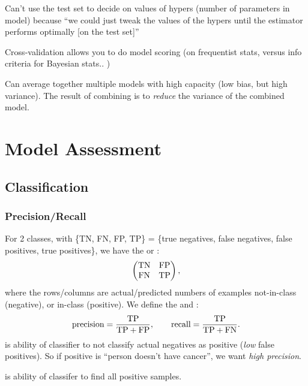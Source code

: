 \documentclass[11pt]{article}
\begin{document}
Can't use the test set to decide on values of hypers (\eeg number of parameters
in model) because ``we could just tweak the values of the hypers until the
estimator performs optimally [on the test set]''

Cross-validation allows you to do model scoring (on frequentist stats, versus
\eeg info criteria for Bayesian stats.. )

Can average together multiple models with high capacity (low bias, but high
variance). The result of combining is to \emph{reduce} the variance of the
combined model.



\section{Model Assessment}
\label{sec:model_ass}
\subsection{Classification}
\subsubsection{Precision/Recall}
For 2 classes, with \{TN, FN, FP, TP\} = \{true negatives, false negatives,
false positives, true positives\}, we have the  or :
\begin{equation}
  \left(
    \begin{matrix}
      \textrm{TN} & \textrm{FP}\\
      \textrm{FN} & \textrm{TP}
    \end{matrix}
  \right),
\end{equation}
where the rows/columns are actual/predicted numbers of examples not-in-class
(negative), or in-class (positive). We define the  and
:
\begin{equation}
  \textrm{precision} = \frac{\textrm{TP}}{\textrm{TP} + \textrm{FP}}, \qquad
  \textrm{recall} = \frac{\textrm{TP}}{\textrm{TP} + \textrm{FN}}.
\end{equation}
 is ability of classifier to not classify actual negatives as
positive (\eie \emph{low} false positives). So \eeg if positive is ``person
doesn't have cancer'', we want \emph{high precision}.

 is ability of classifer to find all positive samples.
\end{document}
